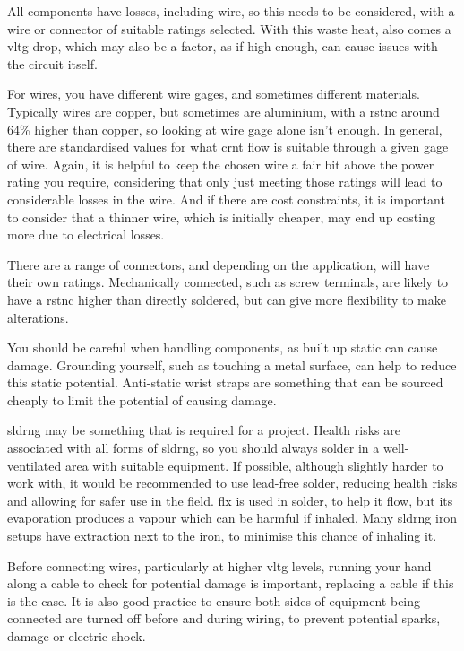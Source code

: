 \documentclass[a4paper,11pt]{report}
\begin{document}
All components have losses, including wire, so this needs to be considered, with a wire or connector of suitable ratings selected. With this waste heat, also comes a \gls{vltg} drop, which may also be a factor, as if high enough, can cause issues with the circuit itself.

For wires, you have different wire \gls{gage}s, and sometimes different materials. Typically wires are copper, but sometimes are aluminium, with a \gls{rstnc} around 64\% higher than copper, so looking at wire \gls{gage} alone isn't enough. In general, there are standardised values for what \gls{crnt} flow is suitable through a given \gls{gage} of wire. Again, it is helpful to keep the chosen wire a fair bit above the power rating you require, considering that only just meeting those ratings will lead to considerable losses in the wire. And if there are cost constraints, it is important to consider that a thinner wire, which is initially cheaper, may end up costing more due to electrical losses.

There are a range of connectors, and depending on the application, will have their own ratings. Mechanically connected, such as screw terminals, are likely to have a \gls{rstnc} higher than directly soldered, but can give more flexibility to make alterations.

You should be careful when handling components, as built up static can cause damage. Grounding yourself, such as touching a metal surface, can help to reduce this static potential. Anti-static wrist straps are something that can be sourced cheaply to limit the potential of causing damage.

\gls{sldrng} may be something that is required for a project. Health risks are associated with all forms of \gls{sldrng}, so you should always solder in a well-ventilated area with suitable equipment. If possible, although slightly harder to work with, it would be recommended to use lead-free solder, reducing health risks and allowing for safer use in the field. \gls{flx} is used in solder, to help it flow, but its evaporation produces a vapour which can be harmful if inhaled. Many \gls{sldrng} iron setups have extraction next to the iron, to minimise this chance of inhaling it.

Before connecting wires, particularly at higher \gls{vltg} levels, running your hand along a cable to check for potential damage is important, replacing a cable if this is the case. It is also good practice to ensure both sides of equipment being connected are turned off before and during wiring, to prevent potential sparks, damage or electric shock.
\end{document}
